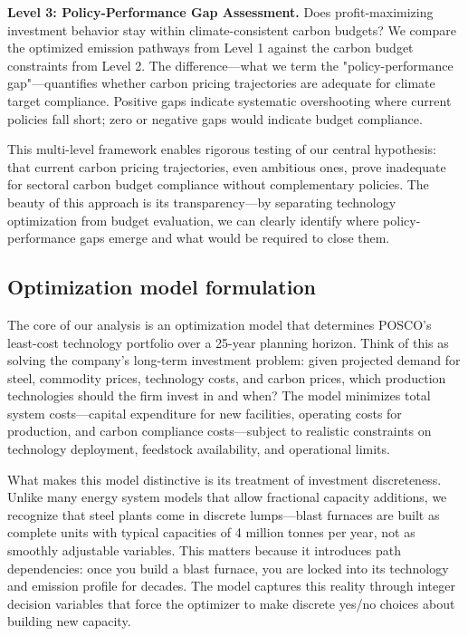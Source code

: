 \textbf{Level 3: Policy-Performance Gap Assessment.} Does profit-maximizing investment behavior stay within climate-consistent carbon budgets? We compare the optimized emission pathways from Level 1 against the carbon budget constraints from Level 2. The difference—what we term the "policy-performance gap"—quantifies whether carbon pricing trajectories are adequate for climate target compliance. Positive gaps indicate systematic overshooting where current policies fall short; zero or negative gaps would indicate budget compliance.

This multi-level framework enables rigorous testing of our central hypothesis: that current carbon pricing trajectories, even ambitious ones, prove inadequate for sectoral carbon budget compliance without complementary policies. The beauty of this approach is its transparency—by separating technology optimization from budget evaluation, we can clearly identify where policy-performance gaps emerge and what would be required to close them.

\subsection{Optimization model formulation}

The core of our analysis is an optimization model that determines POSCO's least-cost technology portfolio over a 25-year planning horizon. Think of this as solving the company's long-term investment problem: given projected demand for steel, commodity prices, technology costs, and carbon prices, which production technologies should the firm invest in and when? The model minimizes total system costs—capital expenditure for new facilities, operating costs for production, and carbon compliance costs—subject to realistic constraints on technology deployment, feedstock availability, and operational limits.

What makes this model distinctive is its treatment of investment discreteness. Unlike many energy system models that allow fractional capacity additions, we recognize that steel plants come in discrete lumps—blast furnaces are built as complete units with typical capacities of 4 million tonnes per year, not as smoothly adjustable variables. This matters because it introduces path dependencies: once you build a blast furnace, you are locked into its technology and emission profile for decades. The model captures this reality through integer decision variables that force the optimizer to make discrete yes/no choices about building new capacity.

